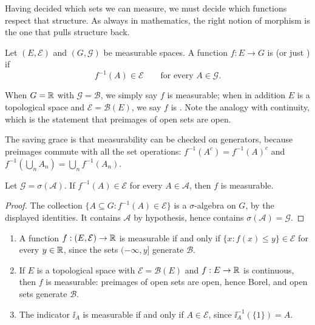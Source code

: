 \documentclass[a4paper]{scrartcl}
\newcommand{\cA}{\mathcal{A}}
\newcommand{\cB}{\mathcal{B}}
\newcommand{\cE}{\mathcal{E}}
\newcommand{\cG}{\mathcal{G}}
\newcommand{\ind}{\ii}
\begin{document}
Having decided which sets we can measure, we must decide which functions respect that structure. As always in mathematics, the right notion of morphism is the one that pulls structure back.

\begin{definition}
	Let $(E, \cE)$ and $(G, \cG)$ be measurable spaces. A function $f : E \to G$ is \vocab{$\cE$-$\cG$ measurable} (or just ) if
	$$
	f^{-1}(A) \in \cE \qquad \text{for every } A \in \cG.
	$$
\end{definition}

When $G = \mathbb{R}$ with $\cG = \cB$, we simply say $f$ is measurable; when in addition $E$ is a topological space and $\cE = \cB(E)$, we say $f$ is . Note the analogy with continuity, which is the statement that preimages of open sets are open.

The saving grace is that measurability can be checked on generators, because preimages commute with all the set operations: $f^{-1}(A^c) = f^{-1}(A)^c$ and $f^{-1}(\bigcup_n A_n) = \bigcup_n f^{-1}(A_n)$.

\begin{lemma}\label{lem:meas-gen}
	Let $\cG = \sigma(\cA)$. If $f^{-1}(A) \in \cE$ for every $A \in \cA$, then $f$ is measurable.
\end{lemma}
\begin{proof}
	The collection $\{A \subseteq G : f^{-1}(A) \in \cE\}$ is a $\sigma$-algebra on $G$, by the displayed identities. It contains $\cA$ by hypothesis, hence contains $\sigma(\cA) = \cG$.
\end{proof}

\begin{example}
	\begin{enumerate}[label=(\roman*)]
		\item A function $f : (E,\cE) \to \R$ is measurable if and only if $\{x : f(x) \leq y\} \in \cE$ for every $y \in \mathbb{R}$, since the sets $(-\infty,y]$ generate $\cB$.
		\item If $E$ is a topological space with $\cE = \cB(E)$ and $f : E \to \mathbb{R}$ is continuous, then $f$ is measurable: preimages of open sets are open, hence Borel, and open sets generate $\cB$.
		\item The indicator $\ind_A$ is measurable if and only if $A \in \cE$, since $\ind_A^{-1}(\{1\}) = A$.
	\end{enumerate}
\end{example}
\end{document}

